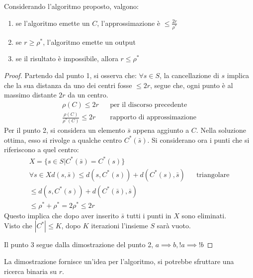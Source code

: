 \begin{theorem}
    Considerando l'algoritmo proposto, valgono:
    \begin{enumerate}
        \item se l'algoritmo emette un $C$, l'approssimazione è $\leq \frac{2r}{\rho^*}$
        \item se $r \geq \rho^*$, l'algoritmo emette un output
        \item se il risultato è impossibile, allora $r \leq \rho^*$
    \end{enumerate}
\end{theorem}
\begin{proof}
    Partendo dal punto 1, si osserva che: $\forall s \in S$, la cancellazione
    di $s$ implica che la sua distanza da uno dei centri fosse $\leq 2r$, segue che, 
    ogni punto è al massimo distante $2r$ da un centro.
    \begin{equation}
        \begin{aligned}
            \rho(C) \leq 2r && \text{per il discorso precedente}\\
            \frac{\rho(C)}{\rho^*(C)} \leq 2r && \text{rapporto di approssimazione}
        \end{aligned}
    \end{equation}
    Per il punto 2, si considera un elemento $\bar{s}$ appena aggiunto a $C$.
    Nella soluzione ottima, esso si rivolge a qualche centro $C^*(\bar{s})$.
    Si considerano ora i punti che si riferiscono a quel centro: 
    \begin{equation}
        \begin{aligned}
            X = \{ s \in S | C^*(\bar{s}) = C^*(s)\}\\
            \forall s \in X
            d(s, \bar{s}) \leq d(s, C^*(s)) + d(C^*(s), \bar{s}) && \text{triangolare}\\
            \leq d(s, C^*(s)) + d(C^*(\bar{s}), \bar{s})\\
            \leq \rho^* + \rho^* = 2 \rho^* \leq 2r
        \end{aligned}
    \end{equation}
    Questo implica che dopo aver inserito $\bar{s}$ tutti i punti in $X$ sono eliminati.\\
    Visto che $|C^*| \leq K$, dopo $K$ iterazioni l'insieme $S$ sarà vuoto.  

    Il punto 3 segue dalla dimostrazione del punto 2, $a \implies b, !a \implies !b$
\end{proof}
\begin{remark}
    La dimostrazione fornisce un'idea per l'algoritmo, si potrebbe sfruttare una 
    ricerca binaria su $r$.
\end{remark}


